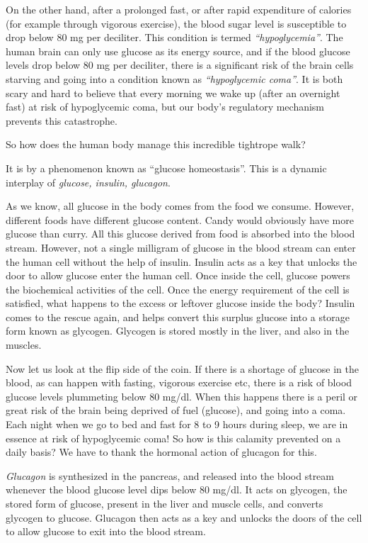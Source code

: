 On the other hand, after a prolonged fast, or after rapid expenditure of calories (for example through vigorous exercise), the blood sugar level is susceptible to drop below 80 mg per deciliter. This condition is termed \textit{“hypoglycemia”}. The human brain can only use glucose as its energy source, and if the blood glucose levels drop below 80 mg per deciliter, there is a significant risk of the brain cells starving and going into a condition known as \textit{“hypoglycemic coma”}. It is both scary and hard to believe that every morning we wake up (after an overnight fast) at risk of hypoglycemic coma, but our body’s regulatory mechanism prevents this catastrophe.

So how does the human body manage this incredible tightrope walk?

It is by a phenomenon known as “glucose homeostasis”. This is a dynamic interplay of \textit{glucose, insulin, glucagon}.

As we know, all glucose in the body comes from the food we consume. However, different foods have different glucose content. Candy would obviously have more glucose than curry. All this glucose derived from food is absorbed into the blood stream. However, not a single milligram of glucose in the blood stream can enter the human cell without the help of insulin. Insulin acts as a key that unlocks the door to allow glucose enter the human cell. Once inside the cell, glucose powers the biochemical activities of the cell. Once the energy requirement of the cell is satisfied, what happens to the excess or leftover glucose inside the body? Insulin comes to the rescue again, and helps convert this surplus glucose into a storage form known as glycogen. Glycogen is stored mostly in the liver, and also in the muscles. 

Now let us look at the flip side of the coin. If there is a shortage of glucose in the blood, as can happen with fasting, vigorous exercise etc, there is a risk of blood glucose levels plummeting below 80 mg/dl. When this happens there is a peril or great risk of the brain being deprived of fuel (glucose), and going into a coma. Each night when we go to bed and fast for 8 to 9 hours during sleep, we are in essence at risk of hypoglycemic coma! So how is this calamity prevented on a daily basis? We have to thank the hormonal action of glucagon for this.

\textit{Glucagon} is synthesized in the pancreas, and released into the blood stream whenever the blood glucose level dips below 80 mg/dl. It acts on glycogen, the stored form of glucose, present in the liver and muscle cells, and converts glycogen to glucose. Glucagon then acts as a key and unlocks the doors of the cell to allow glucose to exit into the blood stream.

